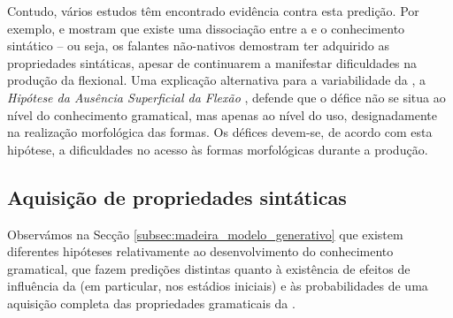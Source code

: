 \documentclass[output=paper]{LSP/langsci}
\begin{document}
Contudo, vários estudos têm encontrado evidência contra esta predição. Por exemplo, \citet{lardiere2000} e \citet{prevostwhite2000} mostram que existe uma dissociação entre a  e o conhecimento sintático – ou seja, os falantes não-nativos demostram ter adquirido as propriedades sintáticas, apesar de continuarem a manifestar dificuldades na produção da  flexional. Uma explicação alternativa para a variabilidade da , a \textit{Hipótese da Ausência Superficial da Flexão} \citep{prevostwhite2000}, defende que o défice não se situa ao nível do conhecimento gramatical, mas apenas ao nível do uso, designadamente na realização morfológica das formas. Os défices devem-se, de acordo com esta hipótese, a dificuldades no acesso às formas morfológicas durante a produção. 


\subsection{Aquisição de propriedades sintáticas}
\label{subsec:madeira_aquisicao_sint}
Observámos na Secção \ref{subsec:madeira_modelo_generativo} que existem diferentes hipóteses relativamente ao desenvolvimento do conhecimento gramatical, que fazem predições distintas quanto à existência de efeitos de influência da  (em particular, nos estádios iniciais) e às probabilidades de uma aquisição completa das propriedades gramaticais da . 
\end{document}
